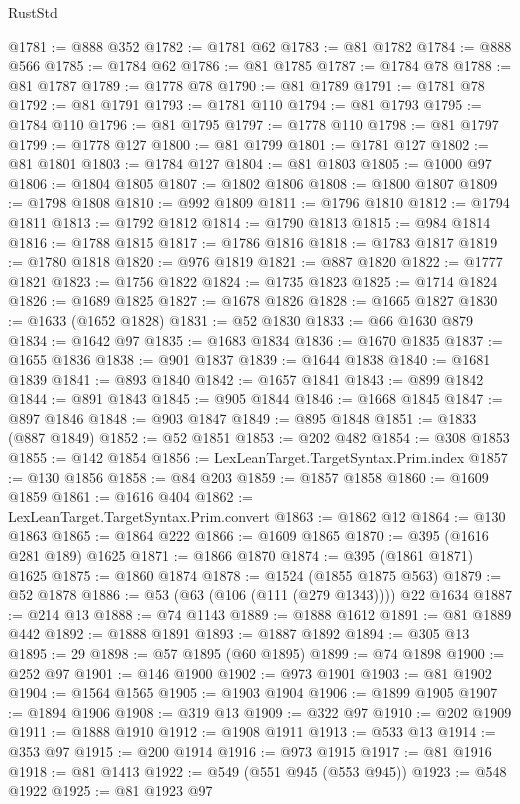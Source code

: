 \begin{lexlean}{RustStd}
\begin{coremodule}
@1781 := @888 @352
@1782 := @1781 @62
@1783 := @81 @1782
@1784 := @888 @566
@1785 := @1784 @62
@1786 := @81 @1785
@1787 := @1784 @78
@1788 := @81 @1787
@1789 := @1778 @78
@1790 := @81 @1789
@1791 := @1781 @78
@1792 := @81 @1791
@1793 := @1781 @110
@1794 := @81 @1793
@1795 := @1784 @110
@1796 := @81 @1795
@1797 := @1778 @110
@1798 := @81 @1797
@1799 := @1778 @127
@1800 := @81 @1799
@1801 := @1781 @127
@1802 := @81 @1801
@1803 := @1784 @127
@1804 := @81 @1803
@1805 := @1000 @97
@1806 := @1804 @1805
@1807 := @1802 @1806
@1808 := @1800 @1807
@1809 := @1798 @1808
@1810 := @992 @1809
@1811 := @1796 @1810
@1812 := @1794 @1811
@1813 := @1792 @1812
@1814 := @1790 @1813
@1815 := @984 @1814
@1816 := @1788 @1815
@1817 := @1786 @1816
@1818 := @1783 @1817
@1819 := @1780 @1818
@1820 := @976 @1819
@1821 := @887 @1820
@1822 := @1777 @1821
@1823 := @1756 @1822
@1824 := @1735 @1823
@1825 := @1714 @1824
@1826 := @1689 @1825
@1827 := @1678 @1826
@1828 := @1665 @1827
@1830 := @1633 (@1652 @1828)
@1831 := @52 @1830
@1833 := @66 @1630 @879
@1834 := @1642 @97
@1835 := @1683 @1834
@1836 := @1670 @1835
@1837 := @1655 @1836
@1838 := @901 @1837
@1839 := @1644 @1838
@1840 := @1681 @1839
@1841 := @893 @1840
@1842 := @1657 @1841
@1843 := @899 @1842
@1844 := @891 @1843
@1845 := @905 @1844
@1846 := @1668 @1845
@1847 := @897 @1846
@1848 := @903 @1847
@1849 := @895 @1848
@1851 := @1833 (@887 @1849)
@1852 := @52 @1851
@1853 := @202 @482
@1854 := @308 @1853
@1855 := @142 @1854
@1856 := LexLeanTarget.TargetSyntax.Prim.index
@1857 := @130 @1856
@1858 := @84 @203
@1859 := @1857 @1858
@1860 := @1609 @1859
@1861 := @1616 @404
@1862 := LexLeanTarget.TargetSyntax.Prim.convert
@1863 := @1862 @12
@1864 := @130 @1863
@1865 := @1864 @222
@1866 := @1609 @1865
@1870 := @395 (@1616 @281 @189) @1625
@1871 := @1866 @1870
@1874 := @395 (@1861 @1871) @1625
@1875 := @1860 @1874
@1878 := @1524 (@1855 @1875 @563)
@1879 := @52 @1878
@1886 := @53 (@63 (@106 (@111 (@279 @1343)))) @22 @1634
@1887 := @214 @13
@1888 := @74 @1143
@1889 := @1888 @1612
@1891 := @81 @1889 @442
@1892 := @1888 @1891
@1893 := @1887 @1892
@1894 := @305 @13
@1895 := 29
@1898 := @57 @1895 (@60 @1895)
@1899 := @74 @1898
@1900 := @252 @97
@1901 := @146 @1900
@1902 := @973 @1901
@1903 := @81 @1902
@1904 := @1564 @1565
@1905 := @1903 @1904
@1906 := @1899 @1905
@1907 := @1894 @1906
@1908 := @319 @13
@1909 := @322 @97
@1910 := @202 @1909
@1911 := @1888 @1910
@1912 := @1908 @1911
@1913 := @533 @13
@1914 := @353 @97
@1915 := @200 @1914
@1916 := @973 @1915
@1917 := @81 @1916
@1918 := @81 @1413
@1922 := @549 (@551 @945 (@553 @945))
@1923 := @548 @1922
@1925 := @81 @1923 @97

\end{coremodule}
\end{lexlean}
